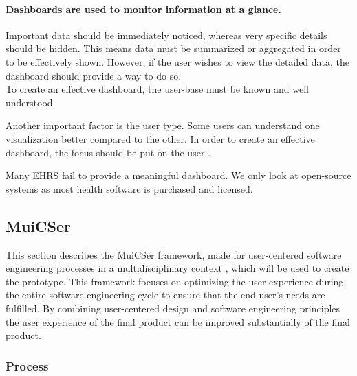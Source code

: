     \paragraph{Dashboards are used to monitor information at a glance.} Important data should be immediately noticed, whereas very specific details should be hidden. This means data must be summarized or aggregated in order to be effectively shown. However, if the user wishes to view the detailed data, the dashboard should provide a way to do so.\\

    \noindent To create an effective dashboard, the user-base must be known and well understood. 
    
    Another important factor is the user type. Some users can understand one visualization better compared to the other. In order to create an effective dashboard, the focus should be put on the user \cite{brath2004dashboard}.
    
    
    Many EHRS fail to provide a meaningful dashboard. We only look at open-source systems as most health software is purchased and licensed.


    \subsection{MuiCSer} \label{2_muicser}
    This section describes the MuiCSer framework, made for user-centered software engineering processes in a multidisciplinary context \cite{muicser}, which will be used to create the prototype. This framework focuses on optimizing the user experience during the entire software engineering cycle to ensure that the end-user's needs are fulfilled. By combining user-centered design and software engineering principles the user experience of the final product can be improved substantially of the final product.

        \subsubsection{Process}
        
